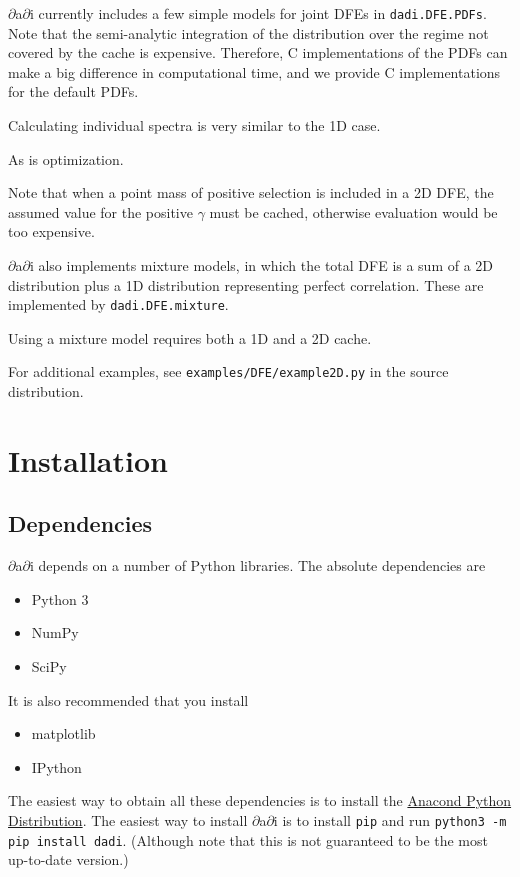 \documentclass[12pt]{article}
\newcommand{\dadi}{$\partial$a$\partial$i\xspace}
\begin{document}
\dadi currently includes a few simple models for joint DFEs in \texttt{dadi.DFE.PDFs}.
Note that the semi-analytic integration of the distribution over the regime not covered by the cache is expensive.
Therefore, C implementations of the PDFs can make a big difference in computational time, and we provide
C implementations for the default PDFs.

Calculating individual spectra is very similar to the 1D case.

As is optimization.

Note that when a point mass of positive selection is included in a 2D DFE, the assumed value for the positive $\gamma$ must be cached, otherwise evaluation would be too expensive.

\dadi also implements mixture models, in which the total DFE is a sum of a 2D distribution plus a 1D distribution representing perfect correlation.
These are implemented by \texttt{dadi.DFE.mixture}.

Using a mixture model requires both a 1D and a 2D cache.

For additional examples, see \texttt{examples/DFE/example2D.py} in the source distribution.

\section{Installation}

\subsection{Dependencies}

\dadi depends on a number of Python libraries. The absolute dependencies are
\begin{itemize}
\item Python 3
\item NumPy
\item SciPy
\end{itemize}
It is also recommended that you install
\begin{itemize}
\item matplotlib
\item IPython
\end{itemize}

The easiest way to obtain all these dependencies is to install the \href{https://www.anaconda.com/distribution/}{Anacond Python Distribution}.
The easiest way to install \dadi is to install \texttt{pip} and run \texttt{python3 -m pip install dadi}.
(Although note that this is not guaranteed to be the most up-to-date version.)
\end{document}
